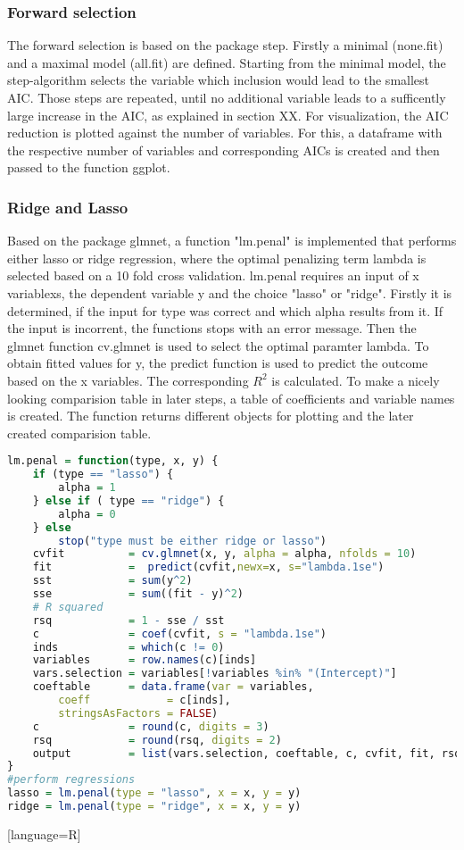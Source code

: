 \subsubsection{Forward selection}
The forward selection is based on the package step. Firstly a minimal (none.fit) and a maximal model (all.fit) are defined. Starting from the minimal model, the step-algorithm selects the variable which inclusion would lead to the smallest AIC. Those steps are repeated, until no additional variable leads to a sufficently large increase in the AIC, as explained in section XX. 
For visualization, the AIC reduction is plotted against the number of variables. For this, a dataframe with the respective number of variables and corresponding AICs is created and then passed to the function ggplot.


\subsubsection{Ridge and Lasso}
Based on the package glmnet, a function "lm.penal" is implemented  that performs either lasso or ridge regression, where the optimal penalizing term lambda is selected based on a 10 fold cross validation. lm.penal requires an input of x variablexs, the dependent variable y and the choice "lasso" or "ridge". Firstly it is determined, if the input for type was correct and which alpha results from it. If the input is incorrent, the functions stops with an error message.
Then the glmnet function cv.glmnet is used to select the optimal paramter lambda. To obtain fitted values for y,  the predict function is used  to predict the outcome based on the x variables. The corresponding $R^{2}$ is calculated.
To make a nicely looking comparision table in later steps, a table of coefficients and variable names is created. The function returns different objects for plotting and the later created comparision table.
\begin{lstlisting}[language=R]
lm.penal = function(type, x, y) {
    if (type == "lasso") {
        alpha = 1
    } else if ( type == "ridge") {
        alpha = 0
    } else
        stop("type must be either ridge or lasso")
    cvfit          = cv.glmnet(x, y, alpha = alpha, nfolds = 10)
    fit            =  predict(cvfit,newx=x, s="lambda.1se")
    sst            = sum(y^2)
    sse            = sum((fit - y)^2)
    # R squared
    rsq            = 1 - sse / sst
    c              = coef(cvfit, s = "lambda.1se")
    inds           = which(c != 0)
    variables      = row.names(c)[inds]
    vars.selection = variables[!variables %in% "(Intercept)"]
    coeftable      = data.frame(var = variables,
        coeff            = c[inds],
        stringsAsFactors = FALSE)
    c              = round(c, digits = 3)
    rsq            = round(rsq, digits = 2)
    output         = list(vars.selection, coeftable, c, cvfit, fit, rsq)
}
#perform regressions
lasso = lm.penal(type = "lasso", x = x, y = y)
ridge = lm.penal(type = "ridge", x = x, y = y)
\end{lstlisting}[language=R]

